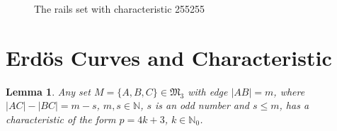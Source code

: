\documentclass[a4paper,14pt]{article} %
\theoremstyle{plain}
\newtheorem{lemma}[theorem]{Lemma}
\theoremstyle{definition}
\begin{document}
\begin{figure}
\caption{The rails set with characteristic 255255}
\label{fig:rails_3_8.png}
\end{figure}

\section{Erdös Curves and Characteristic}

\begin{lemma}
	\label{lem:pre_weeding_I}
	Any set $M = \{A, B, C\} \in \mathfrak{M}_3$ with edge $|AB| = m$, where $|AC| - |BC| = m - s$, $m, s \in \mathbb{N}$, $s$ is an odd number and $s \leq m$, has a characteristic of the form $p = 4k + 3$, $k \in \mathbb{N}_0$.
\end{lemma}
\end{document}
